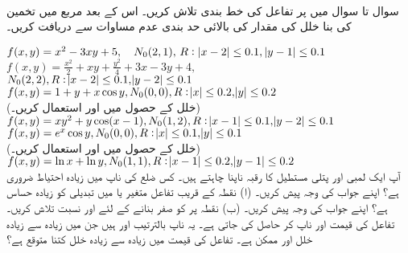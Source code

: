 \\
سوال  تا سوال  میں  پر تفاعل  کی خط بندی  تلاش کریں۔ اس کے بعد مربع  میں تخمین  کی بنا   خلل کی مقدار  کی بالائی  حد بندی عدم مساوات   سے دریافت کریں۔

$f(x,y)=x^2-3xy+5,\quad N_0(2,1),\,R:\,\abs{x-2}\le 0.1,\,\abs{y-1}\le 0.1$
$f(x,y)=\tfrac{x^2}{2}+xy+\tfrac{y^2}{4}+3x-3y+4,$\\
$N_0(2,2),R:\abs{x-2}\le 0.1,\abs{y-2}\le 0.1$
$f(x,y)=1+y+x\cos y, N_0(0,0), R:\abs{x}\le 0.2, \abs{y}\le 0.2$\\
(خلل  کے حصول میں  اور  استعمال کریں۔)
$f(x,y)=xy^2+y\cos(x-1), N_0(1,2), R:\abs{x-1}\le 0.1, \abs{y-2}\le 0.1$
$f(x,y)=e^x\cos y, N_0(0,0), R:\abs{x}\le 0.1,\abs{y}\le 0.1$\\
(خلل  کے حصول میں  اور  استعمال کریں۔)
$f(x,y)=\ln x+\ln y, N_0(1,1), R:\abs{x-1}\le 0.2,\abs{y-1}\le 0.2$
\\
آپ ایک لمبی  اور  پتلی مستطیل کا رقبہ ناپنا چاہتے ہیں۔ کس  ضلع  کی ناپ میں زیادہ احتیاط   ضروری ہے؟ اپنے جواب کی وجہ پیش کریں۔
(ا) نقطہ  کے قریب تفاعل  متغیر  یا   میں تبدیلی کو زیادہ حساس ہے؟ اپنے جواب کی وجہ پیش کریں۔ (ب) نقطہ  پر  کو صفر بنانے کے لئے  اور  نسبت تلاش کریں۔
تفاعل    کی قیمت  اور  ناپ کر حاصل کی جاتی ہے۔ یہ ناپ بالترتیب  اور  ہیں  جن میں زیادہ سے زیادہ خلل  اور  ممکن ہے۔ تفاعل کی قیمت میں زیادہ سے زیادہ خلل کتنا متوقع ہے؟
